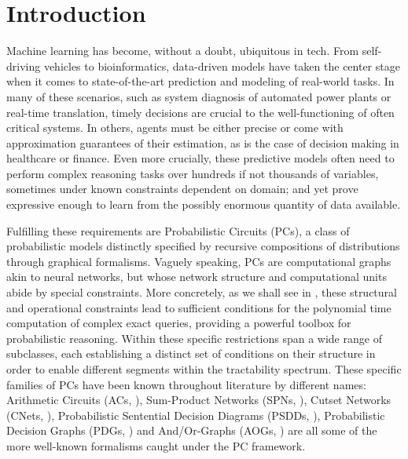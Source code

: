\chapter{Introduction}

Machine learning has become, without a doubt, ubiquitous in tech. From self-driving vehicles to
bioinformatics, data-driven models have taken the center stage when it comes to state-of-the-art
prediction and modeling of real-world tasks. In many of these scenarios, such as system diagnosis
of automated power plants or real-time translation, timely decisions are crucial to the
well-functioning of often critical systems. In others, agents must be either precise or come with
approximation guarantees of their estimation, as is the case of decision making in healthcare or
finance. Even more crucially, these predictive models often need to perform complex reasoning tasks
over hundreds if not thousands of variables, sometimes under known constraints dependent on
domain; and yet prove expressive enough to learn from the possibly enormous quantity of data
available.

Fulfilling these requirements are Probabilistic Circuits (PCs), a class of probabilistic models
distinctly specified by recursive compositions of distributions through graphical formalisms.
Vaguely speaking, PCs are computational graphs akin to neural networks, but whose network structure
and computational units abide by special constraints. More concretely, as we shall see in
, these structural and operational constraints lead to sufficient conditions for the
polynomial time computation of complex exact queries, providing a powerful toolbox for
probabilistic reasoning. Within these specific restrictions span a wide range of subclasses, each
establishing a distinct set of conditions on their structure in order to enable different segments
within the tractability spectrum. These specific families of PCs have been known throughout
literature by different names: Arithmetic Circuits (ACs, \cite{darwiche03}), Sum-Product Networks
(SPNs, \cite{poon11}), Cutset Networks (CNets, \cite{rahman14}), Probabilistic Sentential Decision
Diagrams (PSDDs, \cite{kisa14}), Probabilistic Decision Graphs (PDGs, \cite{jaeger04}) and
And/Or-Graphs (AOGs, \cite{dechter07}) are all some of the more well-known formalisms caught under
the PC framework.

